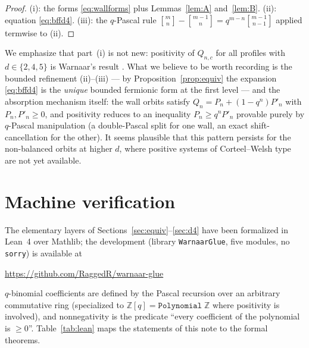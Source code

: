 \documentclass[11pt]{article}
\newcommand{\qbin}[2]{\genfrac{[}{]}{0pt}{}{#1}{#2}}
\newcommand{\ZZ}{\mathbb{Z}}
\begin{document}
\begin{proof}
(i): the forms \eqref{eq:wallforms} plus Lemmas~\ref{lem:A}
and~\ref{lem:B}. (ii): equation \eqref{eq:bffd4}. (iii): the $q$-Pascal
rule $\qbin{m}{n}-\qbin{m-1}{n}=q^{m-n}\qbin{m-1}{n-1}$ applied termwise
to (ii).
\end{proof}

We emphasize that part~(i) is not new: positivity of $Q_{n,c}$ for all
profiles with $d\in\{2,4,5\}$ is Warnaar's result \cite{W23}. What we
believe to be worth recording is the bounded refinement (ii)--(iii) ---
by Proposition~\ref{prop:equiv} the expansion \eqref{eq:bffd4} is the
\emph{unique} bounded fermionic form at the first level --- and the
absorption mechanism itself: the wall orbits satisfy
$Q_n=P_n+(1-q^n)P'_n$ with $P_n,P'_n\ge0$, and positivity reduces to an
inequality $P_n\ge q^nP'_n$ provable purely by $q$-Pascal manipulation
(a double-Pascal split for one wall, an exact shift-cancellation for the
other). It seems plausible that this pattern persists for the
non-balanced orbits at higher $d$, where positive systems of
Corteel--Welsh type are not yet available.

\section{Machine verification}\label{sec:lean}

The elementary layers of Sections~\ref{sec:equiv}--\ref{sec:d4} have been
formalized in Lean~4 over Mathlib; the development (library
\texttt{WarnaarGlue}, five modules, no \texttt{sorry}) is available at
\begin{center}
\url{https://github.com/RaggedR/warnaar-glue}
\end{center}
$q$-binomial coefficients are defined by the Pascal recursion over an
arbitrary commutative ring (specialized to
$\ZZ[q]=\texttt{Polynomial}\;\ZZ$ where positivity is involved), and
nonnegativity is the predicate ``every coefficient of the polynomial is
$\ge0$''. Table~\ref{tab:lean} maps the statements of this note to the
formal theorems.
\end{document}
